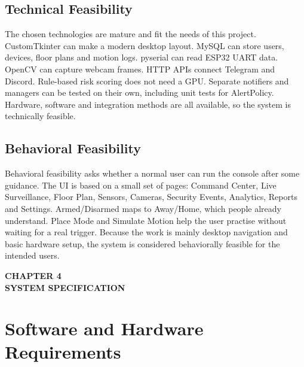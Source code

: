 \documentclass[12pt,a4paper]{report}
\begin{document}
\subsection{Technical Feasibility}

The chosen technologies are mature and fit the needs of this project. CustomTkinter can make a modern desktop layout. MySQL can store users, devices, floor plans and motion logs. pyserial can read ESP32 UART data. OpenCV can capture webcam frames. HTTP APIs connect Telegram and Discord. Rule-based risk scoring does not need a GPU. Separate notifiers and managers can be tested on their own, including unit tests for AlertPolicy. Hardware, software and integration methods are all available, so the system is technically feasible.

\subsection{Behavioral Feasibility}

Behavioral feasibility asks whether a normal user can run the console after some guidance. The UI is based on a small set of pages: Command Center, Live Surveillance, Floor Plan, Sensors, Cameras, Security Events, Analytics, Reports and Settings. Armed/Disarmed maps to Away/Home, which people already understand. Place Mode and Simulate Motion help the user practise without waiting for a real trigger. Because the work is mainly desktop navigation and basic hardware setup, the system is considered behaviorally feasible for the intended users.



\cleardoublepage
\thispagestyle{empty}

\null
\vfill

\begin{center}
    {\fontsize{16pt}{18pt}\selectfont\bfseries
    CHAPTER 4}\\[0.5cm]

    {\fontsize{16pt}{18pt}\selectfont\bfseries
    SYSTEM SPECIFICATION}
\end{center}

\vfill
\null

\clearpage

\section{Software and Hardware Requirements}
\end{document}
